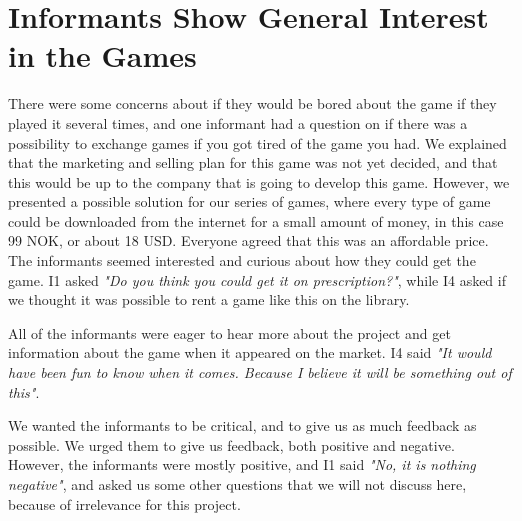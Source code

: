 \section{Informants Show General Interest in the Games}

There were some concerns about if they would be bored about the game if they played it several times, and one informant had a question on if there was a possibility to exchange games if you got tired of the game you had. We explained that the marketing and selling plan for this game was not yet decided, and that this would be up to the company that is going to develop this game. However, we presented a possible solution for our series of games, where every type of game could be downloaded from the internet for a small amount of money, in this case 99 NOK, or about 18 USD. Everyone agreed that this was an affordable price. The informants seemed interested and curious about how they could get the game. I1 asked \emph{"Do you think you could get it on prescription?"}, while I4 asked if we thought it was possible to rent a game like this on the library.

All of the informants were eager to hear more about the project and get information about the game when it appeared on the market. I4 said \emph{"It would have been fun to know when it comes. Because I believe it will be something out of this"}. 

We wanted the informants to be critical, and to give us as much feedback as possible. We urged them to give us feedback, both positive and negative. However, the informants were mostly positive, and I1 said \emph{"No, it is nothing negative"}, and asked us some other questions that we will not discuss here, because of irrelevance for this project. 

